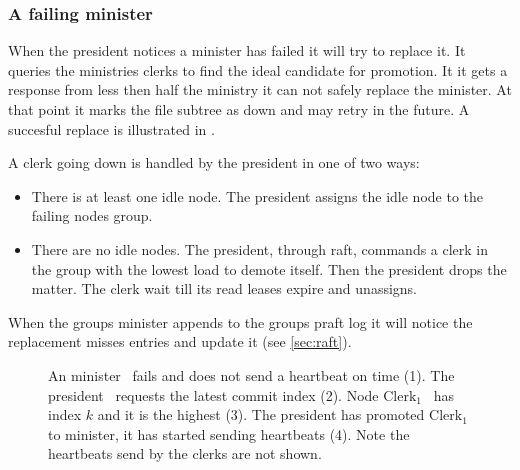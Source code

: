 \subsubsection*{A failing minister}
When the president notices a minister has failed it will try to replace it. It queries the ministries clerks to find the ideal candidate for promotion. It it gets a response from less then half the ministry it can not safely replace the minister. At that point it marks the file subtree as down and may retry in the future. A succesful replace is illustrated in .

A clerk going down is handled by the president in one of two ways:
\begin{itemize}
	\item There is at least one idle node. The president assigns the idle node to the failing nodes group. 
	\item There are no idle nodes. The president, through raft, commands a clerk in the group with the lowest load to demote itself. Then the president drops the matter. The clerk wait till its read leases expire and unassigns.
\end{itemize}
%
When the groups minister appends to the groups \ac{praft} log it will notice the replacement misses entries and update it (see \cref{sec:raft}).

\begin{figure}[htbp]
	\centering
	
	\caption{An minister~\amdsLeg{} fails and does not send a heartbeat on time (1). The president~\presidentLeg{} requests the latest commit index (2). Node $\text{Clerk}_1$~\cmdsLeg{} has index $k$ and it is the highest (3). The president has promoted $\text{Clerk}_1$ to minister, it has started sending heartbeats (4). Note the heartbeats send by the clerks are not shown.}
	\label{fig:appoint}
\end{figure}
%
